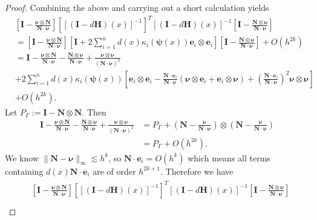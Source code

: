 \documentclass{siamart0516}
\numberwithin{equation}{section}
\numberwithin{theorem}{section}
\numberwithin{figure}{section}
\begin{document}
\begin{proof}
Combining the above and carrying out a short calculation yields
\begin{align*}
	&\left[ \mathbf{I} - \frac{\mathbf{\nu}\otimes\mathbf{N}}{\mathbf{N}\cdot\mathbf{\nu}}\right][[(\mathbf{I} - d\mathbf{H})(x)]^{-1}]^T[(\mathbf{I} - d\mathbf{H})(x)]^{-1}\left[\mathbf{I} - \frac{\mathbf{N}\otimes\mathbf{\nu}}{\mathbf{N}\cdot\mathbf{\nu}} \right]\\
	&=
	\left[ \mathbf{I} - \frac{\mathbf{\nu}\otimes\mathbf{N}}{\mathbf{N}\cdot\mathbf{\nu}}\right][\mathbf{I} + 2\sum_{i=1}^nd(x)\kappa_i(\mathbf{\psi}(x))\mathbf{e}_i\otimes\mathbf{e}_i]\left[ \mathbf{I} - \frac{\mathbf{N}\otimes\mathbf{\nu}}{\mathbf{N}\cdot\mathbf{\nu}} \right] + O(h^{2k})\\
	&=
	 \mathbf{I} - \frac{\mathbf{\nu}\otimes\mathbf{N}}{\mathbf{N}\cdot\mathbf{\nu}} - \frac{\mathbf{N}\otimes\mathbf{\nu}}{\mathbf{N}\cdot\mathbf{\nu}} + \frac{\mathbf{\nu}\otimes\mathbf{\nu}}{(\mathbf{N}\cdot\mathbf{\nu})^2}\\
	&+ 2\sum_{i=1}^nd(x)\kappa_i(\mathbf{\psi}(x))\left[ \mathbf{e}_i\otimes\mathbf{e}_i - \frac{\mathbf{N}\cdot \mathbf{e}_i}{\mathbf{N}\cdot\mathbf{\nu}}\left(\mathbf{\nu}\otimes\mathbf{e}_i
	+\mathbf{e}_i\otimes\mathbf{\nu}\right)
	+ \left(\frac{\mathbf{N}\cdot \mathbf{e}_i}{\mathbf{N}\cdot\mathbf{\nu}}\right)^2\mathbf{\nu}\otimes\mathbf{\nu}\right]
	\\
	&+ O(h^{2k}).
\end{align*}
Let $P_\Gamma:=\mathbf{I}-\mathbf{N}\otimes\mathbf{N}$. Then
\begin{align*}
 \mathbf{I} - \frac{\mathbf{\nu}\otimes\mathbf{N}}{\mathbf{N}\cdot\mathbf{\nu}} - \frac{\mathbf{N}\otimes\mathbf{\nu}}{\mathbf{N}\cdot\mathbf{\nu}} + \frac{\mathbf{\nu}\otimes\mathbf{\nu}}{(\mathbf{N}\cdot\mathbf{\nu})^2}
 &=
 P_\Gamma + \left(\mathbf{N} - \frac{\mathbf{\nu}}{\mathbf{N}\cdot\mathbf{\nu}}\right)\otimes\left(\mathbf{N} - \frac{\mathbf{\nu}}{\mathbf{N}\cdot\mathbf{\nu}}\right)
\\&=
 P_\Gamma + O(h^{2k}).
\end{align*}
We know $\|\mathbf{N}-\mathbf{\nu}\|_\infty \lesssim h^{k}$, so $\mathbf{N}\cdot \mathbf{e}_i = O(h^{k})$ which means all terms containing $d(x)\mathbf{N}\cdot \mathbf{e}_i$ are of order $h^{2k+1}$. Therefore we have
\begin{align}
\begin{aligned}
&\left[ \mathbf{I} - \frac{\mathbf{\nu}\otimes\mathbf{N}}{\mathbf{N}\cdot\mathbf{\nu}}\right][[(\mathbf{I} - d\mathbf{H})(x)]^{-1}]^T[(\mathbf{I} - d\mathbf{H})(x)]^{-1}\left[ \mathbf{I} - \frac{\mathbf{N}\otimes\mathbf{\nu}}{\mathbf{N}\cdot\mathbf{\nu}} \right]\\

\end{aligned}
\end{align}
\end{proof}
\end{document}
